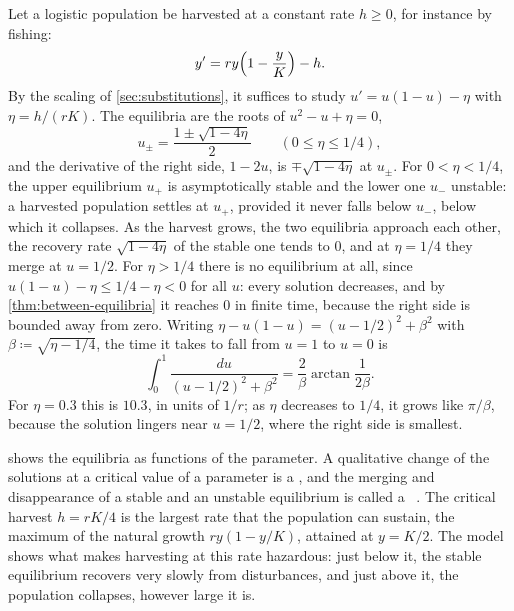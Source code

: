 Let a logistic population be harvested at a constant rate $h\ge0$, for instance by fishing:
\[
y'=ry\Bigl(1-\frac yK\Bigr)-h .
\]
By the scaling of \cref{sec:substitutions}, it suffices to study $u'=u(1-u)-\eta$ with $\eta=h/(rK)$. The equilibria are the roots of $u^2-u+\eta=0$,
\[
u_\pm=\frac{1\pm\sqrt{1-4\eta}}2\qquad(0\le\eta\le1/4),
\]
and the derivative of the right side, $1-2u$, is $\mp\sqrt{1-4\eta}$ at $u_\pm$. For $0<\eta<1/4$, the upper equilibrium $u_+$ is asymptotically stable and the lower one $u_-$ unstable: a harvested population settles at $u_+$, provided it never falls below $u_-$, below which it collapses. As the harvest grows, the two equilibria approach each other, the recovery rate $\sqrt{1-4\eta}$ of the stable one tends to $0$, and at $\eta=1/4$ they merge at $u=1/2$. For $\eta>1/4$ there is no equilibrium at all, since $u(1-u)-\eta\le1/4-\eta<0$ for all $u$: every solution decreases, and by \cref{thm:between-equilibria} it reaches $0$ in finite time, because the right side is bounded away from zero. Writing $\eta-u(1-u)=(u-1/2)^2+\beta^2$ with $\beta\coloneqq\sqrt{\eta-1/4}$, the time it takes to fall from $u=1$ to $u=0$ is
\[
\int_0^1\frac{du}{(u-1/2)^2+\beta^2}=\frac2\beta\arctan\frac1{2\beta} .
\]
For $\eta=0.3$ this is $10.3$, in units of $1/r$; as $\eta$ decreases to $1/4$, it grows like $\pi/\beta$, because the solution lingers near $u=1/2$, where the right side is smallest.

 shows the equilibria as functions of the parameter. A qualitative change of the solutions at a critical value of a parameter is a , and the merging and disappearance of a stable and an unstable equilibrium is called a ~\cite[Sect.~3.1]{strogatz2015}. The critical harvest $h=rK/4$ is the largest rate that the population can sustain, the maximum of the natural growth $ry(1-y/K)$, attained at $y=K/2$. The model shows what makes harvesting at this rate hazardous: just below it, the stable equilibrium recovers very slowly from disturbances, and just above it, the population collapses, however large it is.

